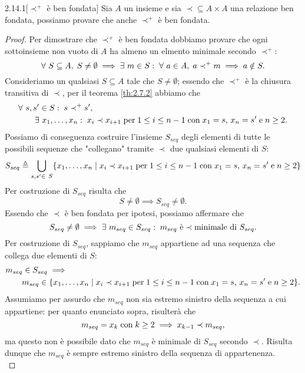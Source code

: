 \begin{customthm}{2.14.1}[$\prec^+$ è ben fondata]
\label{th:2.14.1}
Sia $A$ un insieme e sia ${\prec} \subseteq {A \times A}$ una relazione ben fondata, possiamo provare che anche $\prec^+$ è ben fondata.
\end{customthm}
\begin{proof}
Per dimostrare che $\prec^+$ è ben fondata dobbiamo provare che ogni sottoinsieme non vuoto di $A$ ha almeno un elmento minimale secondo $\prec^+$:
\[
	\forall\ S \subseteq A ,\;
	S \neq \emptyset \implies 
	\exists\ m \in S :\;
		\forall\ a \in A ,\; a \prec^+ m \implies a \notin S.
\]
Consideriamo un qualsiasi $S \subseteq A$ tale che $S \neq \emptyset$; essendo che $\prec^+$ è la chiusura transitiva di $\prec$, per il teorema \ref{th:2.7.2} abbiamo che
\begin{align*}
	& \forall\ s,s' \in S :\; s \prec^+ s' ,\; \\ 
	& \hspace{2em} \exists \ x_1, \ldots, x_n :\; x_i \prec x_{i+1} \; \text{per} \; 1 \leq i \leq n-1 
	               \; \text{con} \; x_1 = s \text{,} \ x_n = s' \; \text{e} \; n \geq 2.
\end{align*}
Possiamo di conseguenza costruire l'insieme $S_{seq}$ degli elementi di tutte le possibili sequenze che "collegano" tramite $\prec$ due qualsiasi elementi di $S$: \[
	S_{seq} \triangleq \bigcup_{s,s' \in\ S}
		\{x_1, \ldots, x_n \mid x_i \prec x_{i+1} \; \text{per} \; 1 \leq i \leq n-1 
		\; \text{con} \; x_1 = s \text{,} \ x_n = s' \; \text{e} \; n \geq 2 \}
\]
Per costruzione di $S_{seq}$ risulta che \[
	S \neq \emptyset \implies S_{seq} \neq \emptyset.
\]
Essendo che $\prec$ è ben fondata per ipotesi, possiamo affermare che \[
	S_{seq} \neq \emptyset 
	\implies \exists\ m_{seq} \in S_{seq} 
 	:\; m_{seq}\ \text{è} \prec \text{minimale di}\ S_{seq}.
\]
Per costruzione di $S_{seq}$, sappiamo che $m_{seq}$ appartiene ad una sequenza che collega due elementi di $S$:
\begin{align*}
	 & m_{seq} \in S_{seq} \implies \\
	 & \hspace{2em} m_{seq} \in \{x_1, \ldots, x_n \mid x_i \prec x_{i+1} \; \text{per} \; 1 \leq i \leq n-1 
	   \; \text{con} \; x_1 = s \text{,} \ x_n = s' \; \text{e} \; n \geq 2 \}.
\end{align*}
Assumiamo per assurdo che $m_{seq}$ non sia estremo sinistro della sequenza a cui appartiene: per quanto enunciato sopra, risulterà che \[
	 m_{seq} = x_k \; \text{con} \; k \geq 2 \implies x_{k-1} \prec m_{seq},
\]
ma questo non è possibile dato che $m_{seq}$ è minimale di $S_{seq}$ secondo $\prec$. Risulta dunque che $m_{seq}$ è sempre estremo sinistro della sequenza di appartenenza.\\ 


\end{proof}
